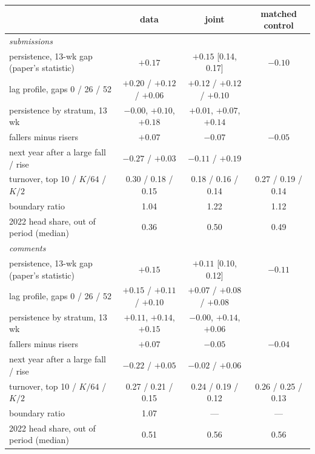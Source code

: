 \documentclass[10pt]{article}
\begin{document}
\begin{center}\small\begin{tabular}{lccc}
\toprule
 & data & joint & matched control\\
\midrule
\multicolumn{4}{l}{\emph{submissions}}\\
persistence, 13-wk gap (paper's statistic) & $+0.17$ & $+0.15$ [0.14, 0.17] & $-0.10$\\
lag profile, gaps 0 / 26 / 52 & $+0.20$ / $+0.12$ / $+0.06$ & $+0.12$ / $+0.12$ / $+0.10$ & \\
persistence by stratum, 13 wk & $-0.00$, $+0.10$, $+0.18$ & $+0.01$, $+0.07$, $+0.14$ & \\
fallers minus risers & $+0.07$ & $-0.07$ & $-0.05$\\
next year after a large fall / rise & $-0.27$ / $+0.03$ & $-0.11$ / $+0.19$ & \\
turnover, top 10 / $K/64$ / $K/2$ & 0.30 / 0.18 / 0.15 & 0.18 / 0.16 / 0.14 & 0.27 / 0.19 / 0.14\\
boundary ratio & 1.04 & 1.22 & 1.12\\
2022 head share, out of period (median) & 0.36 & 0.50 & 0.49\\
\midrule
\multicolumn{4}{l}{\emph{comments}}\\
persistence, 13-wk gap (paper's statistic) & $+0.15$ & $+0.11$ [0.10, 0.12] & $-0.11$\\
lag profile, gaps 0 / 26 / 52 & $+0.15$ / $+0.11$ / $+0.10$ & $+0.07$ / $+0.08$ / $+0.08$ & \\
persistence by stratum, 13 wk & $+0.11$, $+0.14$, $+0.15$ & $-0.00$, $+0.14$, $+0.06$ & \\
fallers minus risers & $+0.07$ & $-0.05$ & $-0.04$\\
next year after a large fall / rise & $-0.22$ / $+0.05$ & $-0.02$ / $+0.06$ & \\
turnover, top 10 / $K/64$ / $K/2$ & 0.27 / 0.21 / 0.15 & 0.24 / 0.19 / 0.12 & 0.26 / 0.25 / 0.13\\
boundary ratio & 1.07 & --- & ---\\
2022 head share, out of period (median) & 0.51 & 0.56 & 0.56\\
\bottomrule
\end{tabular}\end{center}
\end{document}

